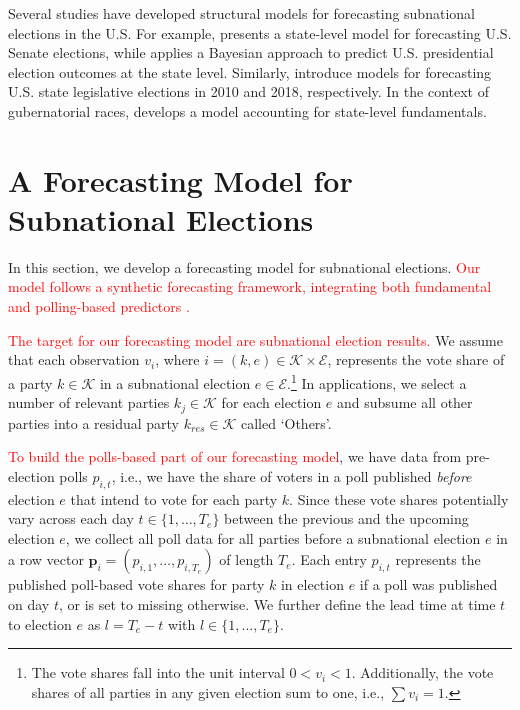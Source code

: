 \documentclass[12pt]{article}
\begin{document}
\begin{doublespacing}
\color{red}
Several studies have developed structural models for forecasting subnational elections in the U.S. For example, \citet{bardwell2004state} presents a state-level model for forecasting U.S. Senate elections, while \citet{linzer2013dynamic} applies a Bayesian approach to predict U.S. presidential election outcomes at the state level. Similarly, \citet{klarner2010forecasting, klarner20182018} introduce models for forecasting U.S. state legislative elections in 2010 and 2018, respectively. In the context of gubernatorial races, \citet{hummel2014fundamental} develops a model accounting for state-level fundamentals.
\color{black}


\section{A Forecasting Model for Subnational Elections}

In this section, we develop a forecasting model for subnational elections. \textcolor{red}{Our model follows a synthetic forecasting framework, integrating both fundamental and polling-based predictors \citep{Lewis-Beck_Nadeau_Belanger_2016, Lewis-Beck_Dassonneville_2015}.}

 \textcolor{red}{The target for our forecasting model are subnational election results.} We assume that each observation \( v_i \), where $i = (k,e) \in \mathcal{K} \times \mathcal{E}$, represents the vote share of a party $k \in \mathcal{K} $   in a subnational election $e \in \mathcal{E}$.\footnote{The vote shares fall into the unit interval \( 0 < v_i < 1 \). Additionally, the vote shares of all parties in any given election sum to one, i.e., $\sum v_i = 1$.} In applications, we select a number of relevant parties $k_j \in \mathcal{K}$ for each election $e$ and subsume all other parties into a residual party $k_{res} \in \mathcal{K}$ called `Others'.

 \textcolor{red}{To build the polls-based part of our forecasting model}, we have data from pre-election polls \( p_{i,t} \), i.e., we have the share of voters in a poll published \textit{before} election $e$ that intend to vote for each party $k$. Since these vote shares potentially vary across each day $t \in \{1, \ldots, T_e\}$ between the previous and the upcoming election $e$, we collect all poll data for all parties  before a subnational election $e$ in a row vector \( \boldsymbol{p}_{i} = (p_{i,1}, \ldots, p_{i,T_{e}}) \) of length $T_e$.   Each entry \( p_{i,t} \) represents the published poll-based vote shares for party $k$ in election $e$ if a poll was published on day \( t \), or  is set to missing otherwise. We further define the lead time at time $t$ to election  $e$ as $l = T_{e} - t$ with $l \in \{1, \ldots, T_e\}$.
 

\end{doublespacing}
\end{document}

